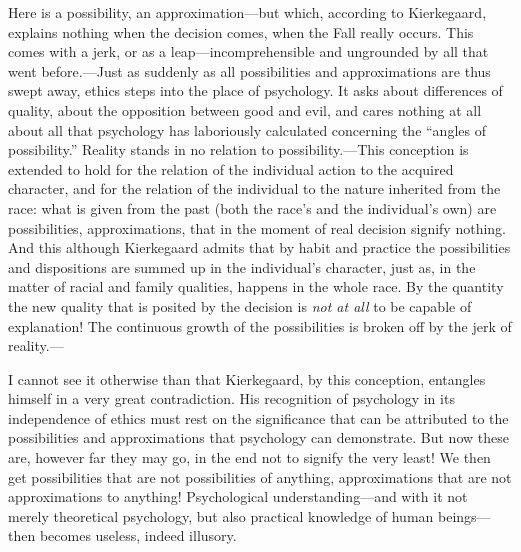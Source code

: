 \documentclass[12pt,a4paper]{book}
\newcommand{\opage}[1]{\marginnote{\footnotesize\textit{[#1]}}}
\begin{document}
Here is a possibility, an approximation---but which, according to
Kierkegaard, explains nothing when the decision comes, when the Fall
really occurs. This comes
\opage{76}with a jerk, or as a leap---incomprehensible and ungrounded by all that
went before.---Just as suddenly as all possibilities and approximations
are thus swept away, ethics steps into the place of psychology. It asks
about differences of quality, about the opposition between good and evil,
and cares nothing at all about all that psychology has laboriously
calculated concerning the ``angles of possibility.'' Reality stands in no
relation to possibility.---This conception is extended to hold for the
relation of the individual action to the acquired character, and for the
relation of the individual to the nature inherited from the race: what is
given from the past (both the race's and the individual's own) are
possibilities, approximations, that in the moment of real decision
signify nothing. And this although Kierkegaard admits that by habit and
practice the possibilities and dispositions are summed up in the
individual's character, just as, in the matter of racial and family
qualities, happens in the whole race. By the quantity the new quality
that is posited by the decision is \textit{not at all} to be capable of
explanation! The continuous growth of the possibilities is broken off by
the jerk of reality.---

I cannot see it otherwise than that Kierkegaard, by this conception,
entangles himself in a very great contradiction. His recognition of
psychology in its independence of ethics must rest on the significance
that can be attributed to the possibilities and approximations that
psychology can demonstrate. But now these are, however far they may go,
in the end not to signify the very least! We then get possibilities that
are not possibilities of anything, approximations that are not
approximations to anything! Psychological understanding---and with it not
merely theoretical psychology, but also practical knowledge of human
beings---then becomes useless, indeed illusory.
\end{document}
